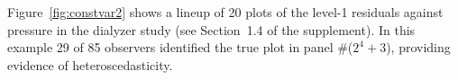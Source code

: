 \documentclass[12pt]{article}
\newcommand{\hh}[1]{{\color{orange} #1}}
\newcommand{\al}[1]{{\color{ForestGreen} #1}}
\newcommand{\alnote}[1]{\todo[inline,color=green!40]{#1}} %
\newcommand{\hhnote}[1]{\todo[inline,color=orange!40]{#1}}
\begin{document}
Figure~\ref{fig:constvar2} shows a lineup of 20 plots of the level-1 residuals against pressure in the dialyzer study (see Section~1.4 of the supplement).
 In this example 29 of 85 observers identified the true plot in panel \#($2^4 +3$), providing evidence of heteroscedasticity. 







\end{document}
